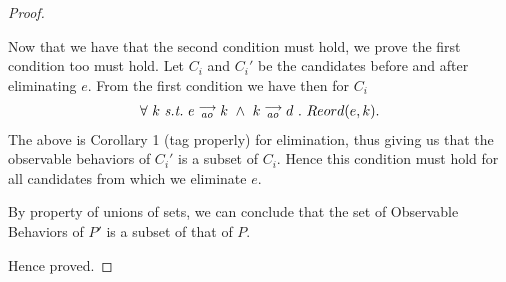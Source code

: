 \begin{proof}
\begin{itemize}

                
        \end{itemize}

        Now that we have that the second condition must hold, we prove the first condition too must hold. Let $C_i$ and $C_i'$ be the candidates before and after eliminating $e$. From the first condition we have then for $C_i$
        \begin{align*}
            \forall \ k \ \textit{s.t.} \ 
            \reln{e}{ao}{k} \ \wedge \ \reln{k}{ao}{d} \ . \ 
            Reord(e,k).
        \end{align*}
        The above is Corollary 1 (tag properly) for elimination, thus giving us that the observable behaviors of $C_i'$ is a subset of $C_i$. Hence this condition must hold for all candidates from which we eliminate $e$. 

        By property of unions of sets, we can conclude that the set of Observable Behaviors of $P'$ is a subset of that of $P$.

        Hence proved.

    \end{proof}